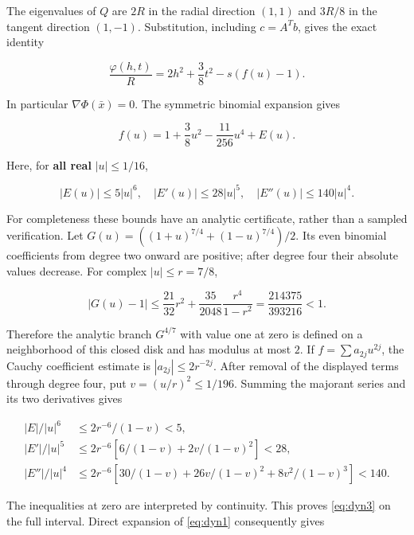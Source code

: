 \documentclass[11pt]{article}
\theoremstyle{remark}\newtheorem{remark}[theorem]{Remark}
\begin{document}
The eigenvalues of \(Q\) are \(2R\) in the radial direction \((1,1)\) and \(3R/8\) in the tangent direction \((1,-1)\). Substitution, including \(c=A^Tb\), gives the exact identity

\begin{equation}
\frac{\varphi(h,t)}R=2h^2+\frac38t^2-s(f(u)-1). \label{eq:dyn1}
\end{equation}

In particular \(\nabla\Phi(\bar x)=0\). The symmetric binomial expansion gives

\begin{equation}
f(u)=1+\frac38u^2-\frac{11}{256}u^4+E(u). \label{eq:dyn2}
\end{equation}

Here, for \textbf{all real} \(|u|\le1/16\),

\begin{equation}
|E(u)|\le5|u|^6,\quad |E'(u)|\le28|u|^5,\quad
|E''(u)|\le140|u|^4. \label{eq:dyn3}
\end{equation}

For completeness these bounds have an analytic certificate, rather than a sampled verification. Let \(G(u)=((1+u)^{7/4}+(1-u)^{7/4})/2\). Its even binomial coefficients from degree two onward are positive; after degree four their absolute values decrease. For complex \(|u|\le r=7/8\),

\[
|G(u)-1|\le \frac{21}{32}r^2+
\frac{35}{2048}\frac{r^4}{1-r^2}
=\frac{214375}{393216}<1.
\]

Therefore the analytic branch \(G^{4/7}\) with value one at zero is defined on a neighborhood of this closed disk and has modulus at most \(2\). If \(f=\sum a_{2j}u^{2j}\), the Cauchy coefficient estimate is \(|a_{2j}|\le2r^{-2j}\). After removal of the displayed terms through degree four, put \(v=(u/r)^2\le1/196\). Summing the majorant series and its two derivatives gives

\[
\begin{aligned}
|E|/|u|^6&\le 2r^{-6}/(1-v)<5,\\
|E'|/|u|^5&\le 2r^{-6}\left[6/(1-v)+2v/(1-v)^2\right]<28,\\
|E''|/|u|^4&\le 2r^{-6}\left[30/(1-v)+26v/(1-v)^2
                         +8v^2/(1-v)^3\right]<140.
\end{aligned}
\]

The inequalities at zero are interpreted by continuity. This proves \eqref{eq:dyn3} on the full interval. Direct expansion of \eqref{eq:dyn1} consequently gives
\end{document}
